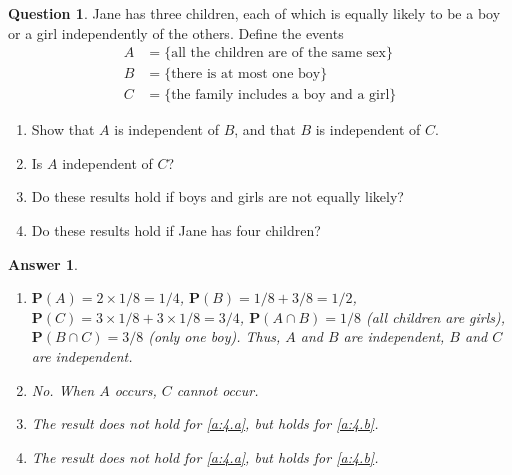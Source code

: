 \documentclass[utf8]{article}
\theoremstyle{definition}%
\newtheorem{question}{Question} %
\theoremstyle{plain}%
\newtheorem{answer}{Answer} %
\begin{document}
\begin{question}
    Jane has three children, each of which is equally likely to be a boy or a girl independently of the others. Define the events
    \begin{align*}
        A &= \{\text{all the children are of the same sex}\} \\
        B &= \{\text{there is at most one boy}\} \\ 
        C &= \{\text{the family includes a boy and a girl}\}
    \end{align*}
    \begin{enumerate}[label=(\alph*)]
        \item Show that $A$ is independent of $B$, and that $B$ is independent of $C$. 
        \item Is $A$ independent of $C$?
        \item Do these results hold if boys and girls are not equally likely? 
        \item Do these results hold if Jane has four children?
    \end{enumerate}
\end{question}
\begin{answer} ~
    \begin{enumerate}[label=(\alph*)]
        \item \label{a:4.a} $\mathbf{P}(A) = 2 \times 1/8 = 1/4$, $\mathbf{P}(B) = 1/8 + 3/8 = 1/2$, $\mathbf{P}(C) = 3 \times 1/8 + 3 \times 1/8 = 3/4$, $\mathbf{P}(A \cap B) = 1/8$ (all children are girls), $\mathbf{P}(B \cap C) = 3/8$ (only one boy). Thus, $A$ and $B$ are independent, $B$ and $C$ are independent.
        \item \label{a:4.b} No. When $A$ occurs, $C$ cannot occur.
        \item The result does not hold for \ref{a:4.a}, but holds for \ref{a:4.b}.
        \item The result does not hold for \ref{a:4.a}, but holds for \ref{a:4.b}.
    \end{enumerate}
\end{answer}
\end{document}
